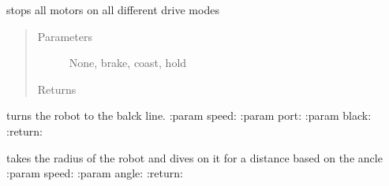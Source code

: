 \documentclass[letterpaper,10pt,english]{sphinxmanual}
\begin{document}
\begin{fulllineitems}

\begin{fulllineitems}
\label{\detokenize{spockbots:spockbots.motor.SpockbotsMotor.still}}
\end{fulllineitems}


\begin{fulllineitems}
\label{\detokenize{spockbots:spockbots.motor.SpockbotsMotor.stop}}
stops all motors on all different drive modes
\begin{quote}\begin{description}
\item[{Parameters}] \leavevmode
{} \textendash{} None, brake, coast, hold

\item[{Returns}] \leavevmode


\end{description}\end{quote}

\end{fulllineitems}


\begin{fulllineitems}
\label{\detokenize{spockbots:spockbots.motor.SpockbotsMotor.tunrtoblack}}
turns the robot to the balck line.
:param speed:
:param port:
:param black:
:return:

\end{fulllineitems}


\begin{fulllineitems}
\label{\detokenize{spockbots:spockbots.motor.SpockbotsMotor.turn}}
takes the radius of the robot and dives on it for a distance based on the ancle
:param speed:
:param angle:
:return:

\end{fulllineitems}


\end{fulllineitems}
\end{document}
